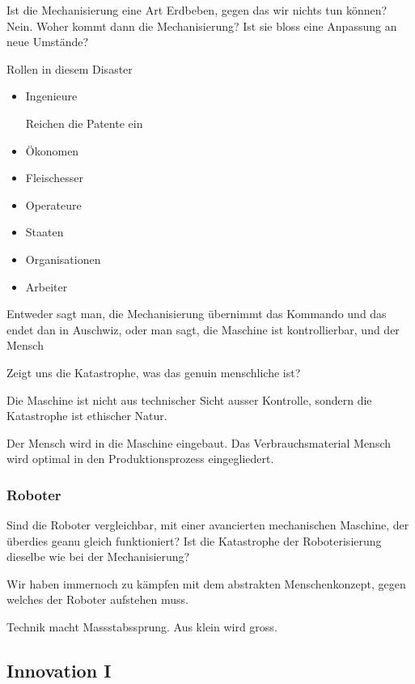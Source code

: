 \documentclass[a4paper,ngerman,11pt]{scrartcl}
\begin{document}
Ist die Mechanisierung eine Art Erdbeben, gegen das wir nichts tun können?
Nein. Woher kommt dann die Mechanisierung? Ist sie bloss eine Anpassung an
neue Umstände?

Rollen in diesem Disaster

\begin{itemize}
\item Ingenieure

Reichen die Patente ein

\item Ökonomen

\item Fleischesser

\item Operateure

\item Staaten

\item Organisationen

\item Arbeiter
\end{itemize}


Entweder sagt man, die Mechanisierung übernimmt das Kommando und das endet
dan in Auschwiz, oder man sagt, die Maschine ist kontrollierbar, und der
Mensch

Zeigt uns die Katastrophe, was das genuin menschliche ist?

Die Maschine ist nicht aus technischer Sicht ausser Kontrolle, sondern die
Katastrophe ist ethischer Natur.

Der Mensch wird in die Maschine eingebaut. Das Verbrauchsmaterial Mensch wird
optimal in den Produktionsprozess eingegliedert.


\subsubsection{Roboter}
\label{sec-2-8-1}

Sind die Roboter vergleichbar, mit einer avancierten mechanischen Maschine,
der überdies geanu gleich funktioniert? Ist die Katastrophe der
Roboterisierung dieselbe wie bei der Mechanisierung?

Wir haben immernoch zu kämpfen mit dem abstrakten Menschenkonzept, gegen
welches der Roboter aufstehen muss.


Technik macht Massstabssprung. Aus klein wird gross.

\subsection{Innovation I}
\label{sec-2-9}
\end{document}
